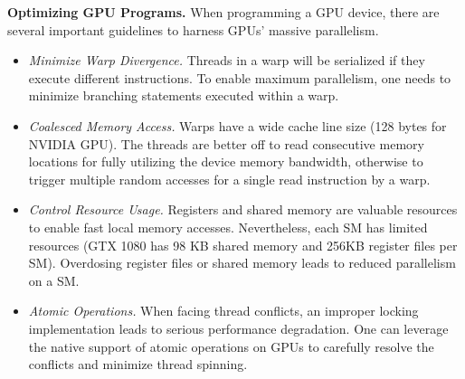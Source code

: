 

\vspace{1mm}\noindent\textbf{Optimizing GPU Programs.}
When programming a GPU device, there are several important guidelines to harness GPUs' massive parallelism.
\begin{itemize}
	\item \emph{Minimize Warp Divergence.} Threads in a warp will be serialized if they execute different instructions. To enable maximum parallelism, one needs to minimize branching statements executed within a warp.  
	\item \emph{Coalesced Memory Access.} Warps have a wide cache line size (128 bytes for NVIDIA GPU). The threads are better off to read consecutive memory locations for fully utilizing the device memory bandwidth, otherwise to trigger multiple random accesses for a single read instruction by a warp. 
	\item \emph{Control Resource Usage.} Registers and shared memory are valuable resources to enable fast local memory accesses. Nevertheless, each SM has limited resources (GTX 1080 has 98 KB shared memory and 256KB register files per SM). Overdosing register files or shared memory leads to reduced parallelism on a SM.  
	\item \emph{Atomic Operations.} When facing thread conflicts, an improper locking implementation leads to serious performance degradation. One can leverage the native support of atomic operations \cite{sanders2010cuda} on GPUs to carefully resolve the conflicts and minimize thread spinning.
\end{itemize}